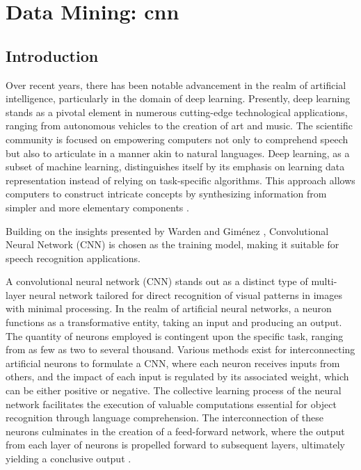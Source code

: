 %
%


\chapter{Data Mining: \ac{cnn}}

\section{Introduction}

Over recent years, there has been notable advancement in the realm of artificial intelligence, particularly in the domain of deep learning. Presently, deep learning stands as a pivotal element in numerous cutting-edge technological applications, ranging from autonomous vehicles to the creation of art and music. The scientific community is focused on empowering computers not only to comprehend speech but also to articulate in a manner akin to natural languages. Deep learning, as a subset of machine learning, distinguishes itself by its emphasis on learning data representation instead of relying on task-specific algorithms. This approach allows computers to construct intricate concepts by synthesizing information from simpler and more elementary components \cite{Sewak:2018, Li:2021}.

Building on the insights presented by Warden \cite{Warden:2019} and Gim\'enez \cite{Gimenez:2022a}, Convolutional Neural Network (CNN) is chosen as the training model, making it suitable for speech recognition applications. 

A convolutional neural network (CNN) stands out as a distinct type of multi-layer neural network tailored for direct recognition of visual patterns in images with minimal processing. In the realm of artificial neural networks, a neuron functions as a transformative entity, taking an input and producing an output. The quantity of neurons employed is contingent upon the specific task, ranging from as few as two to several thousand. Various methods exist for interconnecting artificial neurons to formulate a CNN, where each neuron receives inputs from others, and the impact of each input is regulated by its associated weight, which can be either positive or negative. The collective learning process of the neural network facilitates the execution of valuable computations essential for object recognition through language comprehension. The interconnection of these neurons culminates in the creation of a feed-forward network, where the output from each layer of neurons is propelled forward to subsequent layers, ultimately yielding a conclusive output \cite{Sewak:2018, Gu:2018}.


